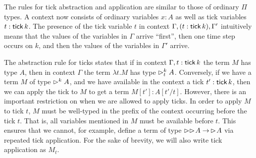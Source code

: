 

The rules for tick abstraction and application are similar to those of ordinary
$\Pi$ types. A context now consists of ordinary variables $x : A$ as well as
tick variables $t : \mathsf{tick}\, k$. The presence of the tick variable $t$ in context
$\Gamma, (t : \mathsf{tick}\, k), \Gamma'$ intuitively means that the values of the
variables in $\Gamma$ arrive ``first'', then one time step occurs on $k$, and
then the values of the variables in $\Gamma'$ arrive.

The abstraction rule for ticks states that if in context $\Gamma, t : \mathsf{tick}\, k$
the term $M$ has type $A$, then in context $\Gamma$ the term $\lambda t.M$ has
type $\vartriangleright^k_t A$. %
%
Conversely, if we have a term $M$ of type $\vartriangleright^k A$, and we have available in
the context a tick $t' : \mathsf{tick}\, k$, then we can apply the tick to $M$ to get a
term $M[t'] : A[t'/t]$. However, there is an important restriction on when we
are allowed to apply ticks. In order to apply $M$ to tick $t$, $M$ must be
well-typed in the prefix of the context occurring before the tick $t$. That is,
all variables mentioned in $M$ must be available before $t$. This ensures that
we cannot, for example, define a term of type $\vartriangleright \vartriangleright \hspace{-0.2em} A \to\, \vartriangleright \hspace{-0.2em}
A$ via repeated tick application.
%
For the sake of brevity, we will also write tick application as $M_t$.



